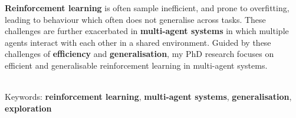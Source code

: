 \documentclass[]{lukas-cv-openfont}
\begin{document}


\vspace{1em}

\noindent
\vspace{-1em}
\begin{flushleft}
    \textbf{Reinforcement learning} is often sample inefficient, and prone to overfitting, leading to behaviour which often does not generalise across tasks. These challenges are further exacerbated in \textbf{multi-agent systems} in which multiple agents interact with each other in a shared environment. Guided by these challenges of \textbf{efficiency} and \textbf{generalisation}, my PhD research focuses on efficient and generalisable reinforcement learning in multi-agent systems.



    \ \\

    Keywords: \textbf{reinforcement learning}, \textbf{multi-agent systems}, \textbf{generalisation}, \textbf{exploration}%
\end{flushleft}
\largesectionsep
\end{document}

